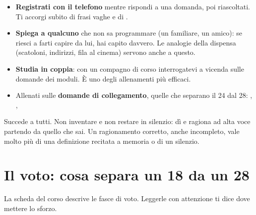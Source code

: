 \begin{consiglio}
\begin{itemize}
  \item \textbf{Registrati con il telefono} mentre rispondi a una domanda, poi
        riascoltati. Ti accorgi subito di frasi vaghe e di .
  \item \textbf{Spiega a qualcuno} che non sa programmare (un familiare, un amico): se
        riesci a farti capire da lui, hai capito davvero. Le analogie della dispensa
        (scatoloni, indirizzi, fila al cinema) servono anche a questo.
  \item \textbf{Studia in coppia}: con un compagno di corso interrogatevi a vicenda
        sulle domande dei moduli. È uno degli allenamenti più efficaci.
  \item Allenati sulle \textbf{domande di collegamento}, quelle che separano il 24 dal
        28: , , 
\end{itemize}
\end{consiglio}

\begin{trappola}
Succede a tutti. Non inventare e non restare in silenzio: dì  e ragiona ad alta voce partendo da quello che sai. Un ragionamento
corretto, anche incompleto, vale molto più di una definizione recitata a memoria o di un
silenzio.
\end{trappola}

\section{Il voto: cosa separa un 18 da un 28}

La scheda del corso descrive le fasce di voto. Leggerle con attenzione ti dice dove
mettere lo sforzo.


